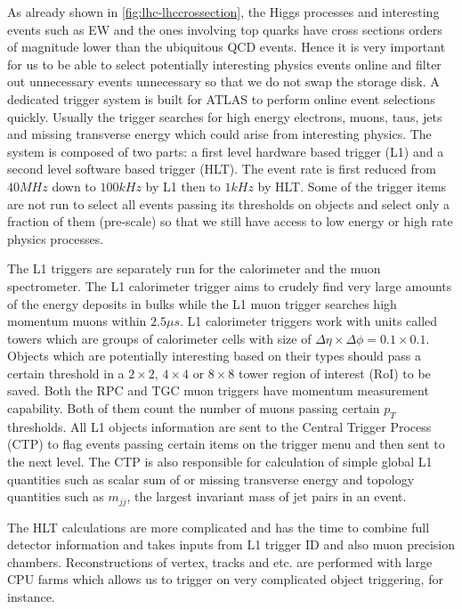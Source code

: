 \label{sec:detector-trigger}

As already shown in \ref{fig:lhc-lhccrossection}, the Higgs processes and interesting events such as EW and the ones involving top quarks have cross sections orders of magnitude lower than the ubiquitous QCD events. Hence it is very important for us to be able to select potentially interesting physics events online and filter out unnecessary events unnecessary so that we do not swap the storage disk. A dedicated trigger system is built for ATLAS to perform online event selections quickly. Usually the trigger searches for high energy electrons, muons, taus, jets and missing transverse energy which could arise from interesting physics. The system is composed of two parts: a first level hardware based trigger (L1) and a second level software based trigger (HLT). The event rate is first reduced from $40MHz$ down to $100kHz$ by L1 then to $1kHz$ by HLT. Some of the trigger items are not run to select all events passing its thresholds on objects and select only a fraction of them (pre-scale) so that we still have access to low energy or high rate physics processes. 

The L1 triggers are separately run for the calorimeter and the muon spectrometer. The L1 calorimeter trigger aims to crudely find very large amounts of the energy deposits in bulks while the L1 muon trigger searches high momentum muons within $2.5\mu s$. L1 calorimeter triggers work with units called towers which are groups of calorimeter cells with size of $\Delta \eta \times \Delta \phi = 0.1\times0.1$. Objects which are potentially interesting based on their types should pass a certain threshold in a $2\times2$, $4\times4$ or $8\times8$ tower region of interest (RoI) to be saved. Both the RPC and TGC muon triggers have momentum measurement capability. Both of them count the number of muons passing certain $p_T$ thresholds. All L1 objects information are sent to the Central Trigger Process (CTP) to flag events passing certain items on the trigger menu and then sent to the next level. The CTP is also responsible for calculation of simple global L1 quantities such as scalar sum of or missing transverse energy and topology quantities such as $m_{jj}$, the largest invariant mass of jet pairs in an event. 

The HLT calculations are more complicated and has the time to combine full detector information and takes inputs from L1 trigger ID and also muon precision chambers. Reconstructions of vertex, tracks and etc. are performed with large CPU farms which allows us to trigger on very complicated object triggering, \bjets for instance. 
